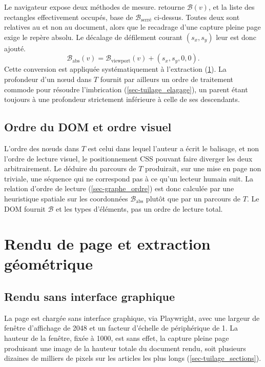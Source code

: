 Le navigateur expose deux méthodes de mesure. 
retourne $\mathcal{B}(v)$, et  la liste des rectangles
effectivement occupés, base de $\mathcal{B}_{\text{serré}}$ ci-dessus. Toutes
deux sont relatives au  et non au document, alors que le
recadrage d'une capture pleine page exige le repère absolu. Le décalage de
défilement courant $(s_x, s_y)$ leur est donc ajouté.
\begin{equation}
\mathcal{B}_{\text{abs}}(v) = \mathcal{B}_{\text{viewport}}(v) + (s_x, s_y, 0, 0).
\label{eq-repere_absolu}
\end{equation}
Cette conversion est appliquée systématiquement à l'extraction
(\cref{sec-rendu}). La profondeur d'un nœud dans $T$ fournit par ailleurs un
ordre de traitement commode pour résoudre l'imbrication
(\cref{sec-tuilage_elagage}), un parent étant toujours à une profondeur
strictement inférieure à celle de ses descendants.

\subsection{Ordre du DOM et ordre visuel}
\label{sec-eda_dom_ordre}

L'ordre des nœuds dans $T$ est celui dans lequel l'auteur a écrit le balisage,
et non l'ordre de lecture visuel, le positionnement CSS pouvant faire diverger
les deux arbitrairement. Le déduire du parcours de $T$ produirait, sur une mise
en page non triviale, une séquence qui ne correspond pas à ce qu'un lecteur
humain suit. La relation d'ordre de lecture
(\cref{sec-graphe_ordre}) est donc calculée par une heuristique spatiale sur les
coordonnées $\mathcal{B}_{\text{abs}}$ plutôt que par un parcours de $T$. Le DOM
fournit $\mathcal{B}$ et les types d'éléments, pas un ordre de lecture total.

\section{Rendu de page et extraction géométrique}
\label{sec-rendu}

\subsection{Rendu sans interface graphique}

La page est chargée sans interface graphique, via Playwright, avec une largeur
de fenêtre d'affichage de \SI{2048}{\pixel} et un facteur d'échelle de
périphérique de \num{1}. La hauteur de la fenêtre, fixée à \SI{1000}{\pixel},
est sans effet, la capture pleine page produisant une image de la hauteur totale
du document rendu, soit plusieurs dizaines de milliers de pixels sur les
articles les plus longs (\cref{sec-tuilage_sections}).

